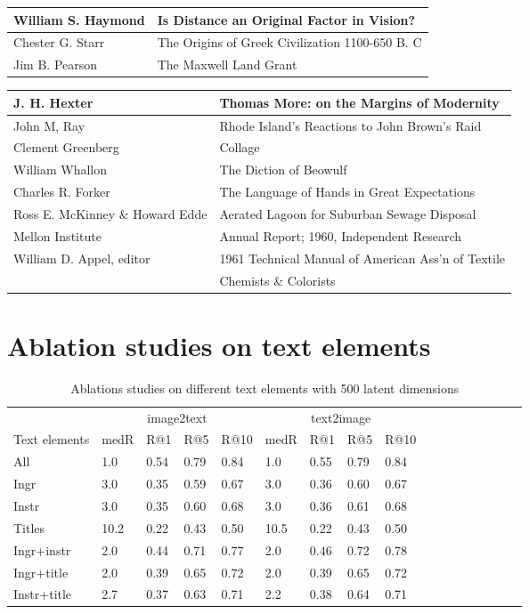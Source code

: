 \documentclass[12pt, titlepage]{article}
\begin{document}
\begin{appendices}
\begin{tabular}{|ll|}
\hline
William S. Haymond & Is Distance an Original Factor in Vision?\\
\hline
Chester G. Starr & The Origins of Greek Civilization 1100-650 B. C\\
\hline
Jim B. Pearson & The Maxwell Land Grant\\
\hline
\end{tabular}
\begin{tabular}{|ll|}
\hline
J. H. Hexter & Thomas More: on the Margins of Modernity\\
\hline
John M, Ray & Rhode Island's Reactions to John Brown's Raid\\
\hline
Clement Greenberg & Collage\\
\hline
William Whallon & The Diction of Beowulf\\
\hline
Charles R. Forker & The Language of Hands in Great Expectations\\
\hline
Ross E. McKinney \& Howard Edde & Aerated Lagoon for Suburban Sewage Disposal\\
\hline
Mellon Institute & Annual Report; 1960, Independent Research\\
\hline
William D. Appel, editor & 1961 Technical Manual of American Ass'n of Textile\\
 & Chemists \& Colorists\\ %
\hline
\end{tabular}

\section{Ablation studies on text elements}
\begin{table}[h]
\begin{center}
\caption{Ablations studies on different text elements with 500 latent dimensions}
\label{tab:cca-element-500}
\begin{tabular}{|l|llll|llll|llll|llll|}
\hline
\toprule
& \multicolumn{4}{c|}{image2text} & \multicolumn{4}{|c|}{text2image}  \\ \cline{2-9}
Text elements & medR   & R@1   & R@5   & R@10  & medR   & R@1   & R@5   & R@10   \\ \cline{1-9}
\midrule
All & 1.0 & 0.54 & 0.79 & 0.84 & 1.0 & 0.55 & 0.79 & 0.84 \\
Ingr & 3.0 & 0.35 & 0.59 & 0.67 & 3.0 & 0.36 & 0.60 & 0.67 \\
Instr & 3.0 & 0.35 & 0.60 & 0.68 & 3.0 & 0.36 & 0.61 & 0.68 \\
Titles & 10.2 & 0.22 & 0.43 & 0.50 & 10.5 & 0.22 & 0.43 & 0.50 \\
Ingr+instr & 2.0 & 0.44 & 0.71 & 0.77 & 2.0 & 0.46 & 0.72 & 0.78 \\
Ingr+title & 2.0 & 0.39 & 0.65 & 0.72 & 2.0 & 0.39 & 0.65 & 0.72 \\
Instr+title & 2.7 & 0.37 & 0.63 & 0.71 & 2.2 & 0.38 & 0.64 & 0.71 \\
\bottomrule
\hline
\end{tabular}
\end{center}
\end{table}


\end{appendices}
\end{document}
